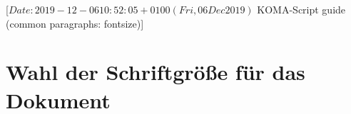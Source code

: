 %
%
%
%
%
%
%
%
% 
%
%
%
%

                 [$Date: 2019-12-06 10:52:05 +0100 (Fri, 06 Dec 2019) $
                  KOMA-Script guide (common paragraphs: fontsize)]

\section{Wahl der Schriftgröße für das Dokument}
\BeginIndexGroup
{}

